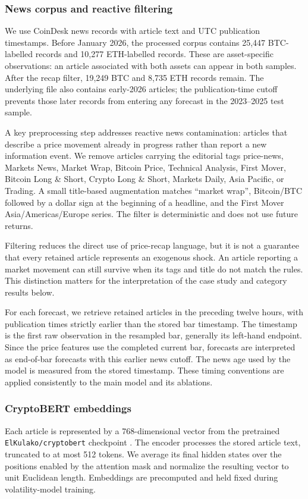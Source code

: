 \subsubsection{News corpus and reactive filtering}
We use CoinDesk news records with article text and UTC publication
timestamps. Before January 2026, the processed corpus contains 25,447
BTC-labelled records and 10,277 ETH-labelled records. These are
asset-specific observations: an article associated with both assets can
appear in both samples. After the recap filter, 19,249 BTC and 8,735 ETH
records remain. The underlying file also contains early-2026 articles;
the publication-time cutoff prevents those later records from entering
any forecast in the 2023--2025 test sample.

A key preprocessing step addresses reactive news contamination:
articles that describe a price movement already in progress rather than
report a new information event. We remove articles carrying the editorial
tags price-news, Markets News, Market Wrap, Bitcoin Price, Technical
Analysis, First Mover, Bitcoin Long \& Short, Crypto Long \& Short,
Markets Daily, Asia Pacific, or Trading. A small title-based augmentation
matches ``market wrap'', Bitcoin/BTC followed by a dollar sign at the
beginning of a headline, and the First Mover Asia/Americas/Europe series.
The filter is deterministic and does not use future returns.

Filtering reduces the direct use of price-recap language, but it is not
a guarantee that every retained article represents an exogenous shock.
An article reporting a market movement can still survive when its tags
and title do not match the rules. This distinction matters for the
interpretation of the case study and category results below.

For each forecast, we retrieve retained articles in the preceding twelve
hours, with publication times strictly earlier than the stored bar
timestamp. The timestamp is the first raw observation in the resampled
bar, generally its left-hand endpoint. Since the price features use the
completed current bar, forecasts are interpreted as end-of-bar forecasts
with this earlier news cutoff. The news age used by the model is measured
from the stored timestamp. These timing conventions are applied
consistently to the main model and its ablations.

\subsubsection{CryptoBERT embeddings}\label{sec:cryptobert}
Each article is represented by a 768-dimensional vector from the
pretrained \texttt{ElKulako/\allowbreak cryptobert} checkpoint
\citep{Kulakowski_2023}. The encoder processes the stored article text,
truncated to at most 512 tokens. We average its final hidden states over
the positions enabled by the attention mask and normalize the resulting
vector to unit Euclidean length. Embeddings are precomputed and held
fixed during volatility-model training.

